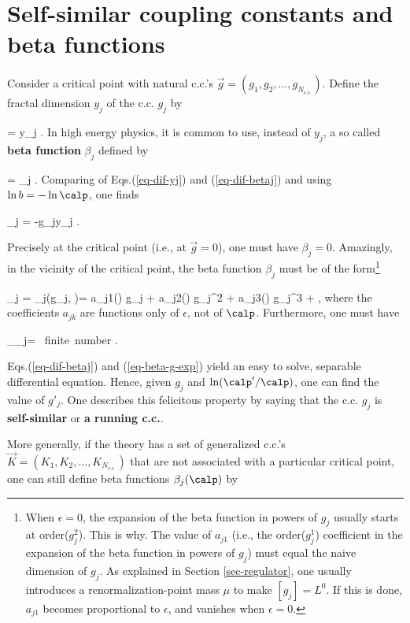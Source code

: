 \section{Self-similar coupling constants and beta functions}

Consider
a critical point
with natural c.c.'s
$\vec{g} =(g_1, g_2, \ldots,
g_{N_{c.c.}})$.
Define the fractal
dimension $y_j$ of the c.c. $g_j$ by

\beq
{}=
y_j
\;.
\label{eq-dif-yj}
\eeq
In high energy physics, it
is common to
use, instead of $y_j$, a so called
\textbf{beta function} $\beta_j$
defined by

\beq
{}=
\beta_j
\;.
\label{eq-dif-betaj}
\eeq
Comparing of Eqs.(\ref{eq-dif-yj})
and (\ref{eq-dif-betaj})
and using $\ln b = -\ln \calp$,
one finds

\beq
\beta_j = -g_j\;y_j
\;.
\eeq

Precisely at the critical point
(i.e., at $\vec{g}=0$),
one must have
$\beta_j=0$.
Amazingly, in the vicinity of
the critical point, the
beta function
$\beta_j$ must be of the
form\footnote{When $\epsilon=0$,
the expansion
of  the beta function
in powers of $g_j$
usually starts
at order($g_j^2$).
This is why. The value of $a_{j1}$ (i.e., the order($g_j^1$)
coefficient in the expansion
of the beta function
in powers of $g_j$)
must equal the naive dimension of
$g_j$. As explained in Section
\ref{sec-regulator}, one usually introduces
a renormalization-point mass
 $\mu$ to make $[g_j]=L^0$.
If this is done, $a_{j1}$
becomes proportional to $\epsilon$,
and vanishes when $\epsilon=0$.
}

\beq
\beta_j = \beta_j(g_j, \epsilon)=
a_{j1}(\epsilon) g_j
+ a_{j2}(\epsilon) g_j^2
+ a_{j3}(\epsilon) g_j^3
+\cdots
\;,
\label{eq-beta-g-exp}
\eeq
where the
coefficients $a_{jk}$
are functions only of $\epsilon$,
not of $\calp$. Furthermore, one
must have

\beq
\lim_{\epsilon{}}\beta_j= \mbox{ finite number}
\;.
\eeq


Eqs.(\ref{eq-dif-betaj})
and (\ref{eq-beta-g-exp}) yield
an easy to
solve, separable differential equation. Hence,
given $g_j$ and
$\ln (\calp'/\calp)$, one can find the value of
$g'_j$.
One describes this felicitous property
by saying that the c.c. $g_j$ is {\bf self-similar}
or {\bf  a running c.c.}.


More generally, if the
theory has a set of
generalized c.c.'s
$\vec{K} =(K_1, K_2, \ldots,
K_{N_{c.c.}})$
that are not associated with
a particular critical point,
one can still define beta
functions $\beta_j(\calp)$
by

